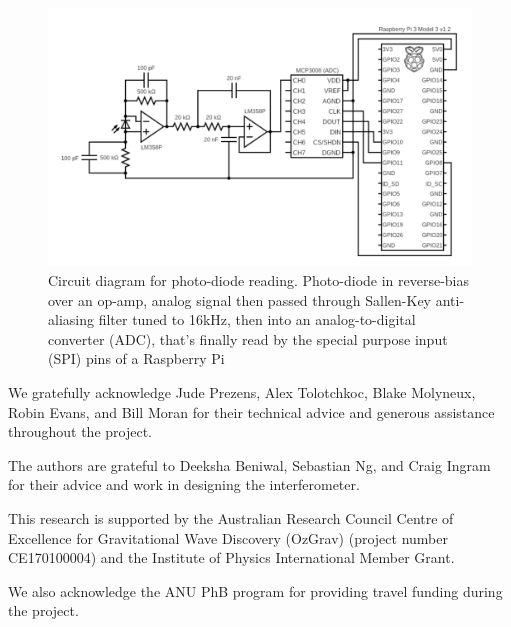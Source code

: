 \documentclass[prb,preprint]{revtex4-1}
\begin{document}
\begin{figure}
	\includegraphics[width=\textwidth]{circuit_diagram.pdf}
	\caption{Circuit diagram for photo-diode reading. Photo-diode in reverse-bias over an op-amp, analog signal then passed through Sallen-Key anti-aliasing filter tuned to 16kHz, then into an analog-to-digital converter (ADC), that’s finally read by the special purpose input (SPI) pins of a Raspberry Pi}
	\label{fig:circuit_diagram}
\end{figure}

\begin{acknowledgments}
We gratefully acknowledge Jude Prezens, Alex Tolotchkoc, Blake Molyneux, Robin Evans, and Bill Moran for their technical advice and generous assistance throughout the project.

The authors are grateful to Deeksha Beniwal, Sebastian Ng, and Craig Ingram for their advice and work in designing the interferometer. 

This research is supported by the Australian Research Council Centre of Excellence for Gravitational Wave Discovery (OzGrav) (project number CE170100004) and the Institute of Physics International Member Grant.

We also acknowledge the ANU PhB program for providing travel funding during the project.


\end{acknowledgments}




\end{document}
